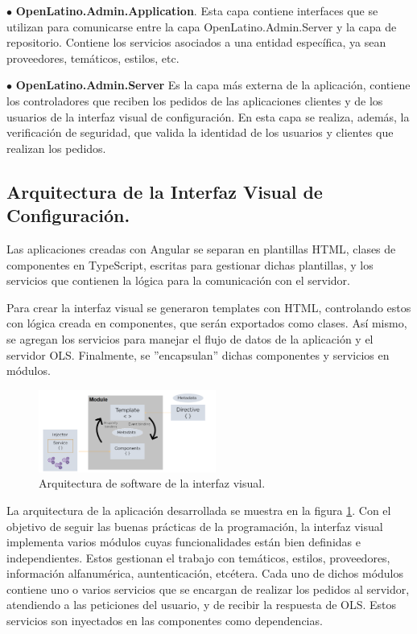 $\bullet$ \textbf{OpenLatino.Admin.Application}. Esta capa contiene interfaces que se utilizan para comunicarse entre la capa OpenLatino.Admin.Server y la capa de repositorio. Contiene los servicios asociados a una entidad espec\'ifica, ya sean proveedores, tem\'aticos, estilos, etc.

$\bullet$ \textbf{OpenLatino.Admin.Server} Es la capa m\'as externa de la aplicaci\'on, contiene los controladores que reciben los pedidos de las aplicaciones clientes y de los usuarios de la interfaz visual de configuraci\'on. En esta capa se realiza, adem\'as, la verificaci\'on de seguridad, que valida la identidad de los usuarios y clientes que realizan los pedidos.


\subsection{Arquitectura de la Interfaz Visual de Configuraci\'on.}
Las aplicaciones creadas con Angular se separan en plantillas HTML, clases de componentes en TypeScript, escritas para gestionar dichas plantillas, y los servicios que contienen la l\'ogica para la comunicaci\'on con el servidor. 

Para crear la interfaz visual se generaron templates con HTML, controlando estos con l\'ogica creada en componentes, que ser\'an exportados como clases. As\'i mismo, se agregan los servicios para manejar el flujo de datos de la aplicaci\'on y el servidor OLS. Finalmente, se ''encapsulan'' dichas componentes y servicios en m\'odulos. 

\begin{figure}
\vspace{-20pt}
\begin{center}
\includegraphics[width=0.52\textwidth]{images/angularArquitecture.png} 
\end{center} \vspace{-20pt} \caption{Arquitectura de software de la interfaz visual.}  \label{arquitecturaAngular} \vspace{-10pt} 
\end{figure}

La arquitectura de la aplicaci\'on desarrollada se muestra en la figura \ref{arquitecturaAngular}. Con el objetivo de seguir las buenas pr\'acticas de la programaci\'on, la interfaz visual implementa varios m\'odulos cuyas funcionalidades est\'an bien definidas e independientes. Estos gestionan el trabajo con tem\'aticos, estilos, proveedores, informaci\'on alfanum\'erica, auntenticaci\'on, etc\'etera. Cada uno de dichos m\'odulos contiene uno o varios servicios que se encargan de realizar los pedidos al servidor, atendiendo a las peticiones del usuario, y de recibir la respuesta de OLS. Estos servicios son inyectados en las componentes como dependencias.

